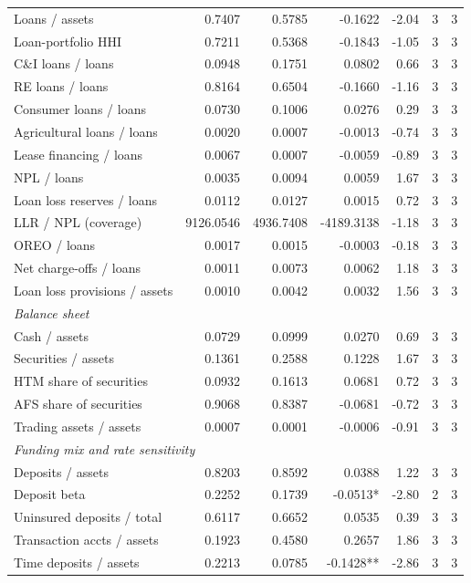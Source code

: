 \begin{tabular}{lrrrrrr}
\midrule
Loans / assets & 0.7407 & 0.5785 & -0.1622 & -2.04 & 3 & 3 \\
Loan-portfolio HHI & 0.7211 & 0.5368 & -0.1843 & -1.05 & 3 & 3 \\
C\&I loans / loans & 0.0948 & 0.1751 & 0.0802 & 0.66 & 3 & 3 \\
RE loans / loans & 0.8164 & 0.6504 & -0.1660 & -1.16 & 3 & 3 \\
Consumer loans / loans & 0.0730 & 0.1006 & 0.0276 & 0.29 & 3 & 3 \\
Agricultural loans / loans & 0.0020 & 0.0007 & -0.0013 & -0.74 & 3 & 3 \\
Lease financing / loans & 0.0067 & 0.0007 & -0.0059 & -0.89 & 3 & 3 \\
NPL / loans & 0.0035 & 0.0094 & 0.0059 & 1.67 & 3 & 3 \\
Loan loss reserves / loans & 0.0112 & 0.0127 & 0.0015 & 0.72 & 3 & 3 \\
LLR / NPL (coverage) & 9126.0546 & 4936.7408 & -4189.3138 & -1.18 & 3 & 3 \\
OREO / loans & 0.0017 & 0.0015 & -0.0003 & -0.18 & 3 & 3 \\
Net charge-offs / loans & 0.0011 & 0.0073 & 0.0062 & 1.18 & 3 & 3 \\
Loan loss provisions / assets & 0.0010 & 0.0042 & 0.0032 & 1.56 & 3 & 3 \\
\midrule
\multicolumn{7}{l}{\emph{Balance sheet}} \\
\midrule
Cash / assets & 0.0729 & 0.0999 & 0.0270 & 0.69 & 3 & 3 \\
Securities / assets & 0.1361 & 0.2588 & 0.1228 & 1.67 & 3 & 3 \\
HTM share of securities & 0.0932 & 0.1613 & 0.0681 & 0.72 & 3 & 3 \\
AFS share of securities & 0.9068 & 0.8387 & -0.0681 & -0.72 & 3 & 3 \\
Trading assets / assets & 0.0007 & 0.0001 & -0.0006 & -0.91 & 3 & 3 \\
\midrule
\multicolumn{7}{l}{\emph{Funding mix and rate sensitivity}} \\
\midrule
Deposits / assets & 0.8203 & 0.8592 & 0.0388 & 1.22 & 3 & 3 \\
Deposit beta & 0.2252 & 0.1739 & -0.0513* & -2.80 & 2 & 3 \\
Uninsured deposits / total & 0.6117 & 0.6652 & 0.0535 & 0.39 & 3 & 3 \\
Transaction accts / assets & 0.1923 & 0.4580 & 0.2657 & 1.86 & 3 & 3 \\
Time deposits / assets & 0.2213 & 0.0785 & -0.1428** & -2.86 & 3 & 3 \\

\end{tabular}
